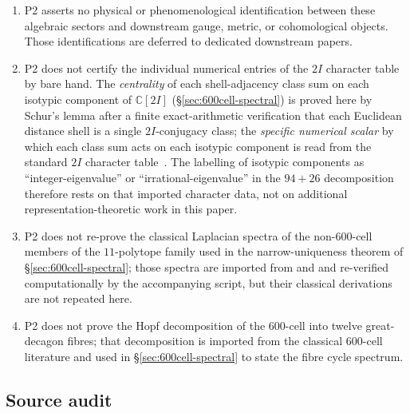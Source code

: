 \documentclass[11pt, a4paper]{amsart}
\theoremstyle{definition}
\newcommand{\C}{\mathbb{C}}
\begin{document}
\begin{enumerate}
  derivations $D_{a,b}$ instead, which is the standard and correct
  construction \cite{BaezOctonions}.
\item P2 asserts no physical or phenomenological identification
  between these algebraic sectors and downstream gauge, metric, or
  cohomological objects. Those identifications are deferred to
  dedicated downstream papers.
\item P2 does not certify the individual numerical entries of the
  $2I$ character table by bare hand. The \emph{centrality}
  of each shell-adjacency class sum on each isotypic component of
  $\C[2I]$ (\S\ref{sec:600cell-spectral}) is proved here by
  Schur's lemma after a finite exact-arithmetic verification that
  each Euclidean distance shell is a single $2I$-conjugacy class;
  the \emph{specific numerical scalar} by which each class sum
  acts on each isotypic component is read from the standard $2I$
  character table~\cite[Ch.~3]{DuVal1964}. The
  labelling of isotypic components as ``integer-eigenvalue'' or
  ``irrational-eigenvalue'' in the $94{+}26$ decomposition
  therefore rests on that imported character data, not on
  additional representation-theoretic work in this paper.
\item P2 does not re-prove the classical Laplacian spectra of the
  non-$600$-cell members of the $11$-polytope family used in the
  narrow-uniqueness theorem of \S\ref{sec:600cell-spectral};
  those spectra are imported from \cite{BrouwerHaemers2012} and
  \cite{GodsilRoyle2001} and re-verified computationally by the
  accompanying script, but their classical derivations are not
  repeated here.
\item P2 does not prove the Hopf decomposition of the $600$-cell
  into twelve great-decagon fibres; that decomposition is
  imported from the classical $600$-cell literature and used in
  \S\ref{sec:600cell-spectral} to state the fibre cycle spectrum.
\end{enumerate}

\subsection{Source audit}
\end{document}
